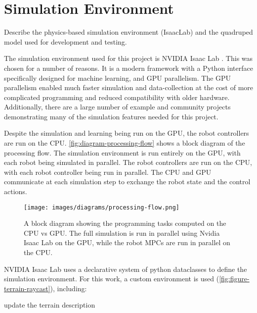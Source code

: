 \section{Simulation Environment}
\label{sec:simulation}

\begin{outline}
  Describe the physics-based simulation environment (IsaacLab) and
  the quadruped model used for development and testing.
\end{outline}

The simulation environment used for this project is NVIDIA Isaac Lab
\cite{mittal_orbit_2023}. This was chosen for a number of reasons. It
is a modern framework with a Python interface specifically designed
for machine learning, and GPU parallelism. The GPU parallelism
enabled much faster simulation and data-collection at the cost of
more complicated programming and reduced compatibility with older
hardware. Additionally, there are a large number of example and
community projects demonstrating many of the simulation features
needed for this project.

Despite the simulation and learning being run on the GPU, the
robot controllers are run on the CPU. \autoref{fig:diagram-processing-flow}
shows a block diagram of the processing flow. The simulation
environment is run entirely on the GPU, with each robot being
simulated in parallel. The robot controllers are run on the CPU,
with each robot controller being run in parallel. The CPU and GPU
communicate at each simulation step to exchange the robot state and
the control actions.

\begin{figure}[H]
  \centering
  \texttt{[image: images/diagrams/processing-flow.png]}
  \caption{A block diagram showing the programming tasks computed on
    the CPU vs GPU. The full simulation is run in parallel using Nvidia
  Isaac Lab on the GPU, while the robot MPCs are run in parallel on the CPU.}
  \label{fig:diagram-processing-flow}
\end{figure}

NVIDIA Isaac Lab uses a declarative system of python dataclasses to
define the simulation environment. For this work, a custom
environment is used (\autoref{fig:figure-terrain-raycast}), including:

\begin{todo}
  update the terrain description
\end{todo}

